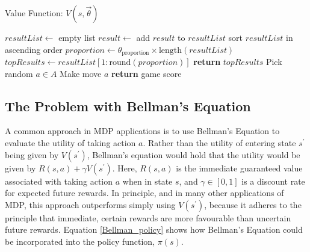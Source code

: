 \documentclass{article}
\begin{document}
\begin{algorithm}
    \caption{Value Function: $V(s, \vec{\theta})$}
    \label{value_function}
    \begin{algorithmic}[1]
            \State $resultList \gets$ empty list
                \State $result \gets$  
                \State add $result$ to $resultList$ 
            \EndFor
            \State sort $resultList$ in ascending order
            \State $proportion \gets \theta_{\text{proportion}} \times \text{length}(resultList)$
            \State $topResults \gets resultList[1:\text{round}(proportion)]$ 
            \State \textbf{return} $topResults$
        \EndFunction
        \Statex
                \State Pick random $a \in A$
                \State Make move $a$
            \EndWhile
            \State \textbf{return} game score
        \EndFunction
    \end{algorithmic}
\end{algorithm}

\subsection{The Problem with Bellman's Equation}
A common approach in MDP applications is to use Bellman's Equation to evaluate the utility of taking action $a$.  Rather than the utility of entering state $s^\prime$ being given by $V(s^\prime)$, Bellman's equation would hold that the utility would be given by $R(s, a) + \gamma V(s^\prime)$.  Here, $R(s, a)$ is the immediate guaranteed value associated with taking action $a$ when in state $s$, and $\gamma \in [0, 1]$ is a discount rate for expected future rewards.  In principle, and in many other applications of MDP, this approach outperforms simply using $V(s^\prime)$, because it adheres to the principle that immediate, certain rewards are more favourable than uncertain future rewards.  Equation \ref{Bellman_policy} shows how Bellman's Equation could be incorporated into the policy function, $\pi (s)$.
\end{document}
